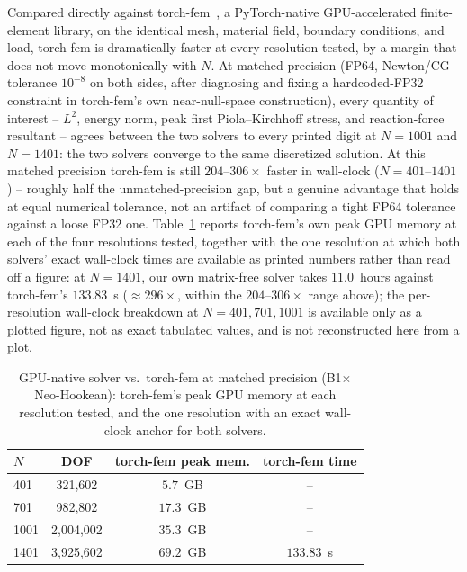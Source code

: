 \documentclass[final,5p,times]{elsarticle}
\begin{document}
Compared directly against torch-fem~\cite{meyer2024torchfem}, a PyTorch-native
GPU-accelerated finite-element library, on the identical mesh, material
field, boundary conditions, and load, torch-fem is dramatically faster at
every resolution tested, by a margin that does not move monotonically with
$N$. At matched precision (FP64, Newton/CG tolerance $10^{-8}$ on both
sides, after diagnosing and fixing a hardcoded-FP32 constraint in torch-fem's
own near-null-space construction), every quantity of interest -- $L^2$,
energy norm, peak first Piola--Kirchhoff stress, and reaction-force
resultant -- agrees between the two solvers to every printed digit at
$N{=}1001$ and $N{=}1401$: the two solvers converge to the same
discretized solution. At this matched precision torch-fem is still
$204$--$306\times$ faster in wall-clock ($N{=}401$--$1401$) -- roughly
half the unmatched-precision gap, but a genuine advantage that holds at
equal numerical tolerance, not an artifact of comparing a tight FP64
tolerance against a loose FP32 one.
Table~\ref{tab:gpu-fem-matched} reports torch-fem's own peak GPU memory at
each of the four resolutions tested, together with the one resolution at
which both solvers' exact wall-clock times are available as printed
numbers rather than read off a figure: at $N{=}1401$, our own
matrix-free solver takes $11.0$~hours against torch-fem's $133.83$~s
($\approx296\times$, within the $204$--$306\times$ range above); the
per-resolution wall-clock breakdown at $N{=}401,701,1001$ is available
only as a plotted figure, not as exact tabulated values, and is not
reconstructed here from a plot.

\begin{table}[h]
\centering
\caption{GPU-native solver vs.\ torch-fem at matched precision
  (B1$\times$Neo-Hookean): torch-fem's peak GPU memory at each resolution
  tested, and the one resolution with an exact wall-clock anchor for both
  solvers.}
\label{tab:gpu-fem-matched}
\footnotesize
\begin{tabular}{lccc}
\toprule
$N$ & DOF & torch-fem peak mem. & torch-fem time \\
\midrule
401  & 321{,}602    & $5.7$~GB  & -- \\
701  & 982{,}802    & $17.3$~GB & -- \\
1001 & 2{,}004{,}002 & $35.3$~GB & -- \\
1401 & 3{,}925{,}602 & $69.2$~GB & $133.83$~s \\
\bottomrule
\end{tabular}
\end{table}
\end{document}
